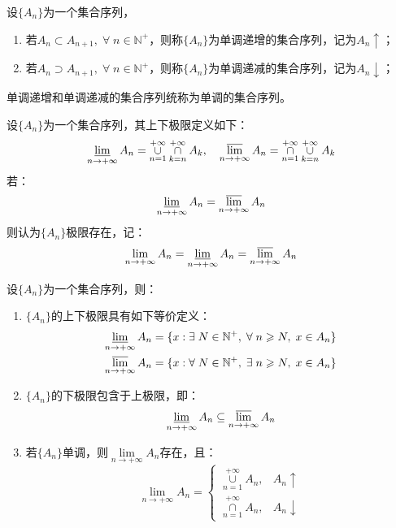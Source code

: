\begin{definition}
	设$\{A_n\}$为一个集合序列，
	\begin{enumerate}
		\item 若$A_n\subset A_{n+1},\;\forall\;n\in\mathbb{N}^+$，则称$\{A_n\}$为单调递增的集合序列，记为$A_n\uparrow$；
		\item 若$A_n\supset A_{n+1},\;\forall\;n\in\mathbb{N}^+$，则称$\{A_n\}$为单调递减的集合序列，记为$A_n\downarrow$；
	\end{enumerate}
	单调递增和单调递减的集合序列统称为单调的集合序列。
\end{definition}
\begin{definition}
	设$\{A_n\}$为一个集合序列，其上下极限定义如下：
	\begin{equation*}
		\varliminf_{n\to+\infty}A_n=\underset{n=1}{\overset{+\infty}{\cup}}\underset{k=n}{\overset{+\infty}{\cap}}A_k,\quad
		\varlimsup_{n\to+\infty}A_n=\underset{n=1}{\overset{+\infty}{\cap}}\underset{k=n}{\overset{+\infty}{\cup}}A_k
	\end{equation*}
	若：
	\begin{equation*}
		\varliminf_{n\to+\infty}A_n=\varlimsup_{n\to+\infty}A_n
	\end{equation*}
	则认为$\{A_n\}$极限存在，记：
	\begin{equation*}
		\lim_{n\to+\infty}A_n=\varliminf_{n\to+\infty}A_n=\varlimsup_{n\to+\infty}A_n
	\end{equation*}
\end{definition}
\begin{property}\label{prop:SetLimit}
	设$\{A_n\}$为一个集合序列，则：
	\begin{enumerate}
		\item $\{A_n\}$的上下极限具有如下等价定义：
		\begin{gather*}
			\varliminf_{n\to+\infty}A_n=\{x:\exists\;N\in\mathbb{N}^+,\;\forall\;n\geqslant N,\;x\in A_n\} \\
			\varlimsup_{n\to+\infty}A_n=\{x:\forall\;N\in\mathbb{N}^+,\;\exists\;n\geqslant N,\;x\in A_n\}
		\end{gather*}
		\item $\{A_n\}$的下极限包含于上极限，即：
		\begin{equation*}
			\varliminf_{n\to+\infty}A_n\subseteq\varlimsup_{n\to+\infty}A_n
		\end{equation*}
		\item 若$\{A_n\}$单调，则$\lim\limits_{n\to+\infty}A_n$存在，且：
		\begin{equation*}
			\lim_{n\to+\infty}A_n=
			\begin{cases}
				\underset{n=1}{\overset{+\infty}{\cup}}A_n,&A_n\uparrow \\
				\underset{n=1}{\overset{+\infty}{\cap}}A_n,&A_n\downarrow 
			\end{cases}
		\end{equation*}
	\end{enumerate}
\end{property}
